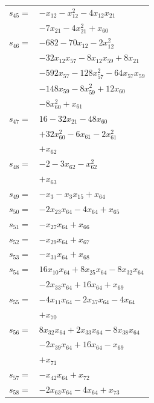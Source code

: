 \begin{longtable}{@{}r@{\;}l@{}}
\(s_{45}=\) & \(\displaystyle -x_{12} -x_{12}^{2} -4x_{12}x_{21}\) \\
 & \(\displaystyle -7x_{21} -4x_{21}^{2} +x_{60}\) \\[3pt]
\(s_{46}=\) & \(\displaystyle -682 -70x_{12} -2x_{12}^{2}\) \\
 & \(\displaystyle -32x_{12}x_{57} -8x_{12}x_{59} +8x_{21}\) \\
 & \(\displaystyle -592x_{57} -128x_{57}^{2} -64x_{57}x_{59}\) \\
 & \(\displaystyle -148x_{59} -8x_{59}^{2} +12x_{60}\) \\
 & \(\displaystyle -8x_{60}^{2} +x_{61}\) \\[3pt]
\(s_{47}=\) & \(\displaystyle 16 -32x_{21} -48x_{60}\) \\
 & \(\displaystyle +32x_{60}^{2} -6x_{61} -2x_{61}^{2}\) \\
 & \(\displaystyle +x_{62}\) \\[3pt]
\(s_{48}=\) & \(\displaystyle -2 -3x_{62} -x_{62}^{2}\) \\
 & \(\displaystyle +x_{63}\) \\[3pt]
\(s_{49}=\) & \(\displaystyle -x_{3} -x_{3}x_{15} +x_{64}\) \\[3pt]
\(s_{50}=\) & \(\displaystyle -2x_{23}x_{64} -4x_{64} +x_{65}\) \\[3pt]
\(s_{51}=\) & \(\displaystyle -x_{27}x_{64} +x_{66}\) \\[3pt]
\(s_{52}=\) & \(\displaystyle -x_{29}x_{64} +x_{67}\) \\[3pt]
\(s_{53}=\) & \(\displaystyle -x_{31}x_{64} +x_{68}\) \\[3pt]
\(s_{54}=\) & \(\displaystyle 16x_{10}x_{64} +8x_{25}x_{64} -8x_{32}x_{64}\) \\
 & \(\displaystyle -2x_{33}x_{64} +16x_{64} +x_{69}\) \\[3pt]
\(s_{55}=\) & \(\displaystyle -4x_{11}x_{64} -2x_{37}x_{64} -4x_{64}\) \\
 & \(\displaystyle +x_{70}\) \\[3pt]
\(s_{56}=\) & \(\displaystyle 8x_{32}x_{64} +2x_{33}x_{64} -8x_{38}x_{64}\) \\
 & \(\displaystyle -2x_{39}x_{64} +16x_{64} -x_{69}\) \\
 & \(\displaystyle +x_{71}\) \\[3pt]
\(s_{57}=\) & \(\displaystyle -x_{42}x_{64} +x_{72}\) \\[3pt]
\(s_{58}=\) & \(\displaystyle -2x_{63}x_{64} -4x_{64} +x_{73}\) \\[3pt]

\end{longtable}
